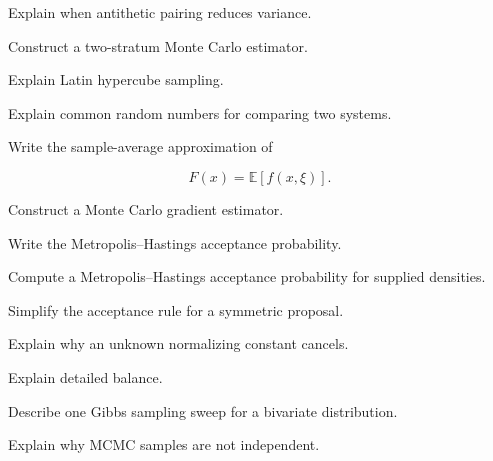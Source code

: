 \begin{exercise}[3]
Explain when antithetic pairing reduces variance.
\end{exercise}

\begin{exercise}[3]
Construct a two-stratum Monte Carlo estimator.
\end{exercise}

\begin{exercise}[3]
Explain Latin hypercube sampling.
\end{exercise}

\begin{exercise}[3]
Explain common random numbers for comparing two systems.
\end{exercise}

\begin{exercise}[2]
Write the sample-average approximation of

\[
F(x)
=
\mathbb{E}[f(x,\xi)].
\]
\end{exercise}

\begin{exercise}[3]
Construct a Monte Carlo gradient estimator.
\end{exercise}

\begin{exercise}[2]
Write the Metropolis--Hastings acceptance probability.
\end{exercise}

\begin{exercise}[3]
Compute a Metropolis--Hastings acceptance probability for supplied
densities.
\end{exercise}

\begin{exercise}[3]
Simplify the acceptance rule for a symmetric proposal.
\end{exercise}

\begin{exercise}[3]
Explain why an unknown normalizing constant cancels.
\end{exercise}

\begin{exercise}[3]
Explain detailed balance.
\end{exercise}

\begin{exercise}[3]
Describe one Gibbs sampling sweep for a bivariate distribution.
\end{exercise}

\begin{exercise}[3]
Explain why MCMC samples are not independent.
\end{exercise}

